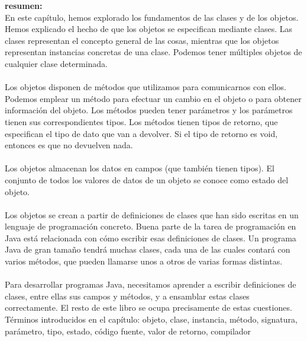 \documentclass[11pt,a4paper]{article}
\begin{document}
	\textbf{resumen:}\\
	En este capítulo, hemos explorado los fundamentos de las clases y de los objetos. Hemos explicado
	el hecho de que los objetos se especifican mediante clases. Las clases representan el concepto
	general de las cosas, mientras que los objetos representan instancias concretas de una clase. Podemos
	tener múltiples objetos de cualquier clase determinada.\\
	\\
	Los objetos disponen de métodos que utilizamos para comunicarnos con ellos. Podemos emplear
	un método para efectuar un cambio en el objeto o para obtener información del objeto. Los métodos
	pueden tener parámetros y los parámetros tienen sus correspondientes tipos. Los métodos
	tienen tipos de retorno, que especifican el tipo de dato que van a devolver. Si el tipo de retorno es
	void, entonces es que no devuelven nada.\\
	\\
	Los objetos almacenan los datos en campos (que también tienen tipos). El conjunto de todos los
	valores de datos de un objeto se conoce como estado del objeto.\\
	\\
	Los objetos se crean a partir de definiciones de clases que han sido escritas en un lenguaje de programación
	concreto. Buena parte de la tarea de programación en Java está relacionada con cómo
	escribir esas definiciones de clases. Un programa Java de gran tamaño tendrá muchas clases, cada
	una de las cuales contará con varios métodos, que pueden llamarse unos a otros de varias formas
	distintas.\\
	\\
	Para desarrollar programas Java, necesitamos aprender a escribir definiciones de clases, entre ellas
	sus campos y métodos, y a ensamblar estas clases correctamente. El resto de este libro se ocupa
	precisamente de estas cuestiones.
	Términos introducidos en el capítulo:
	objeto, clase, instancia, método, signatura, parámetro, tipo, estado, código fuente,
	valor de retorno, compilador
\end{document}
